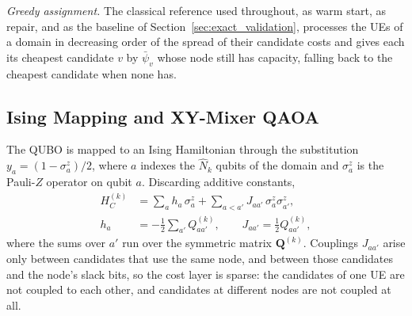 \emph{Greedy assignment.} The classical reference used throughout, as warm start, as repair, and as the baseline of
Section~\ref{sec:exact_validation}, processes the UEs of a domain in decreasing order of the spread of their
candidate costs and gives each its cheapest candidate $v$ by $\bar\psi_v$ whose node still has capacity, falling back
to the cheapest candidate when none has.

\subsection{Ising Mapping and XY-Mixer QAOA}
\label{sec:qaoa}

The QUBO is mapped to an Ising Hamiltonian through the substitution $y_a=(1-\sigma^{z}_{a})/2$, where $a$ indexes the
$\hat N_k$ qubits of the domain and $\sigma^z_a$ is the Pauli-$Z$ operator on qubit $a$. Discarding additive constants,
\begin{align}
    H_{C}^{(k)}&=\sum_{a} h_{a}\,\sigma^{z}_{a}+\sum_{a<a'}J_{aa'}\,\sigma^{z}_{a}\sigma^{z}_{a'},
    \nonumber\\
    h_{a}&=-\frac{1}{2}\sum_{a'}Q^{(k)}_{aa'},\qquad J_{aa'}=\frac{1}{2}Q^{(k)}_{aa'},
    \label{eq:Hc}
\end{align}
where the sums over $a'$ run over the symmetric matrix $\mathbf{Q}^{(k)}$. Couplings $J_{aa'}$ arise only between
candidates that use the same node, and between those candidates and the node's slack bits, so the cost layer is
sparse: the candidates of one UE are not coupled to each other, and candidates at different nodes are not coupled at
all.

